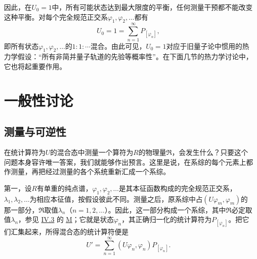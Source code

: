 \documentclass[fontsize=13pt,twoside,openany,headings=normal,parskip=false,bookmarkpackage=false,DIV=calc]{scrbook}
\newcommand{\textkaishu}[1]{{\zhkaishu #1}}
\begin{document}
因此，在$U_0=1$中，所有可能状态达到最大限度的平衡，任何测量干预都不能改变这种平衡。对每个\hypertarget{origpage-184}{}\label{origpage-184}完全规范正交系$\varphi_1,\allowbreak \varphi_2,\allowbreak \ldots$都有
\[
U_0=1=\sum_{n=1}^{\infty}P_{[\varphi_n]},
\]
即所有状态$\varphi_1,\allowbreak \varphi_2,\allowbreak \ldots$的$1:1:\cdots$混合。由此可见，$U_0=1$对应于旧量子论中惯用的热力学假设：“\textkaishu{所有非简并量子轨道的先验等概率性}”。在下面几节的热力学讨论中，它也将起重要作用。

\chapter{一般性讨论}\label{chap:V}
\section{测量与可逆性}\label{sec:V.1}
在统计算符为$U$的混合态中测量一个算符为$R$的物理量$\mathfrak R$，会发生什么？只要这个问题本身容许唯一答案，我们就能够作出预言。这里是说，在系综的每个元素上都作测量，再把经过测量的各个系统重新汇成一个系综。

第一，设$R$有单重的纯点谱，$\varphi_1,\allowbreak \varphi_2,\allowbreak \ldots$是其本征函数构成的完全规范正交系，$\lambda_1,\allowbreak \lambda_2,\allowbreak \ldots$为相应本征值，按假设彼此不同。测量之后，原系综中占$(U\varphi_m,\allowbreak \varphi_m)$的那一部分，$\mathfrak R$取值$\lambda_n$（$n=1,\allowbreak 2,\allowbreak \ldots$）。因此，这一部分构成一个系综，其中$\mathfrak R$必定取值$\lambda_n$，参见 \hyperref[sec:IV.3]{IV.3} 的 \hyperref[post:IV.3.M]{M}；它就是状态$\varphi_n$，其正确归一化的统计算符为$P_{[\varphi_n]}$。把它们汇集起来，所得混合态的统计算符便是
\[
U'=\sum_{n=1}^{\infty}(U\varphi_n,\varphi_n)P_{[\varphi_n]}.
\]
\end{document}
